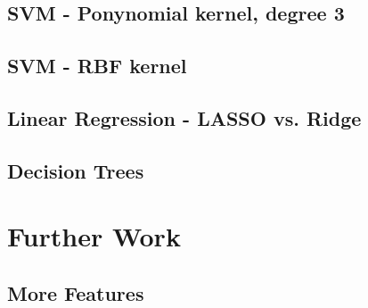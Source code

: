 \documentclass{article}
\begin{document}
\subsection{SVM - Ponynomial kernel, degree 3}

\subsection{SVM - RBF kernel}


\subsection{Linear Regression - LASSO vs. Ridge}



\subsection{Decision Trees}








\section{Further Work}

\subsection{More Features}
\end{document}
